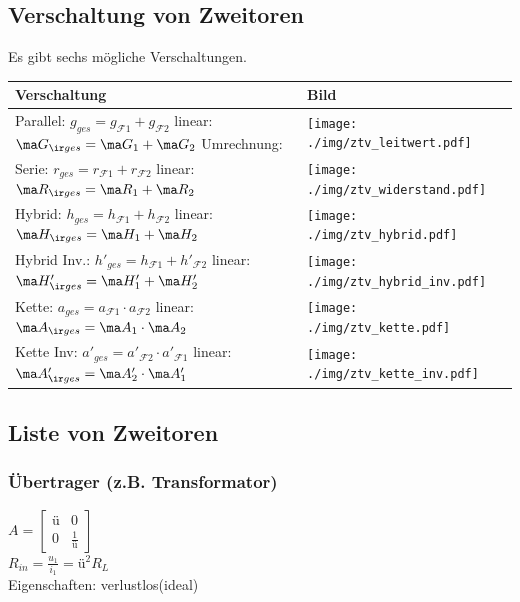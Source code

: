 \documentclass[fs, footer]{latex4ei}
\begin{document}
\begin{multicols*}{4}
	\subsection{Verschaltung von Zweitoren}
	Es gibt sechs mögliche Verschaltungen.\\
	\begin{tabular}{@{}ll}
		Verschaltung & Bild\\ \hline
		\parbox{3cm}{Parallel: $g_{ges}=g_{\mathcal F1}+g_{\mathcal F2}$ \\ linear: $\ma G_{\ir ges} = \ma G_1 + \ma G_2$ \\ Umrechnung: } & \parbox{2.5cm}{\texttt{[image: ./img/ztv\_leitwert.pdf]}}\\[2em]
		\parbox{3cm}{Serie: $r_{ges}=r_{\mathcal F1}+r_{\mathcal F2}$ \\ linear: $\ma R_{\ir ges} = \ma R_1 + \ma R_2$} & \parbox{2.5cm}{\texttt{[image: ./img/ztv\_widerstand.pdf]}}\\[2em]
		\parbox{3cm}{Hybrid: $h_{ges}=h_{\mathcal F1}+h_{\mathcal F2}$ \\ linear: $\ma H_{\ir ges} = \ma H_1 + \ma H_2$} & \parbox{2.5cm}{\texttt{[image: ./img/ztv\_hybrid.pdf]}}\\[2em]
		\parbox{3.5cm}{Hybrid Inv.: $h'_{ges}=h_{\mathcal F1}+h'_{\mathcal F2}$ \\ linear: $\ma H'_{\ir ges} = \ma H'_1 + \ma H'_2$} & \parbox{2.5cm}{\texttt{[image: ./img/ztv\_hybrid\_inv.pdf]}}\\[2em]
		\parbox{3cm}{Kette: $a_{ges}=a_{\mathcal F1} \cdot a_{\mathcal F2}$ \\ linear: $\ma A_{\ir ges} = \ma A_1 \cdot \ma A_2$} & \parbox{2.5cm}{\texttt{[image: ./img/ztv\_kette.pdf]}}\\[2em]
		\parbox{3cm}{Kette Inv: $a'_{ges}=a'_{\mathcal F2} \cdot a'_{\mathcal F1}$ \\ linear: $\ma A'_{\ir ges} = \ma A'_2 \cdot \ma A'_1$} & \parbox{2.5cm}{\texttt{[image: ./img/ztv\_kette\_inv.pdf]}}\\
	\end{tabular}

	\subsection{Liste von Zweitoren}

		\subsubsection{Übertrager (z.B. Transformator)}
		$A=\begin{bmatrix} \text{ü} & 0 \\ 0 & \frac{1}{\text{ü}} \end{bmatrix}$\\
		$R_{in}=\frac{u_1}{i_1}=\text{ü}^2 R_L$\\
		Eigenschaften: verlustlos(ideal)


\end{multicols*}
\end{document}
